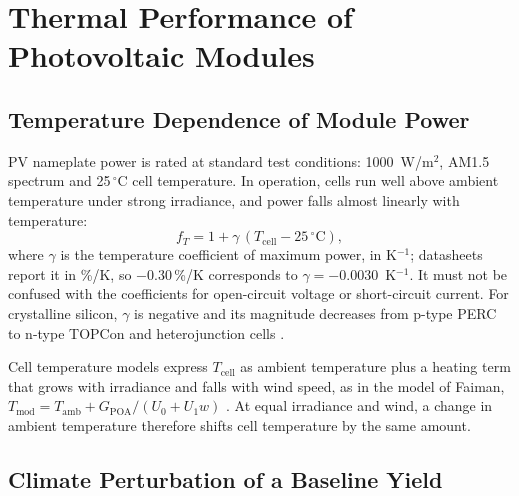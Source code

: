 \section{Thermal Performance of Photovoltaic Modules}
\label{sec:pv_thermal_theory}

\subsection{Temperature Dependence of Module Power}
\label{subsec:pv_temperature}

PV nameplate power is rated at standard test conditions: 1000~W/m$^2$,
AM1.5 spectrum and 25\,$^\circ$C cell temperature. In operation, cells
run well above ambient temperature under strong irradiance, and power
falls almost linearly with temperature:
\begin{equation}
    f_T = 1+\gamma\,(T_{\mathrm{cell}}-25\,^\circ\mathrm{C}),
    \label{eq:pv_thermal_factor}
\end{equation}
where $\gamma$ is the temperature coefficient of maximum power, in
K$^{-1}$; datasheets report it in \%/K, so $-0.30$\,\%/K corresponds to
$\gamma=-0.0030$~K$^{-1}$. It must not be confused with the coefficients
for open-circuit voltage or short-circuit current. For crystalline
silicon, $\gamma$ is negative and its magnitude decreases from p-type
PERC to n-type TOPCon and heterojunction cells
\cite{bamisile2025,itrpv2025}.

Cell temperature models express $T_{\mathrm{cell}}$ as ambient
temperature plus a heating term that grows with irradiance and falls with
wind speed, as in the model of Faiman,
$T_{\mathrm{mod}} = T_{\mathrm{amb}} + G_{\mathrm{POA}}/(U_0+U_1 w)$
\cite{faiman2008}. At equal irradiance and wind, a change in ambient
temperature therefore shifts cell temperature by the same amount.

\subsection{Climate Perturbation of a Baseline Yield}
\label{subsec:pv_climate_perturbation}

